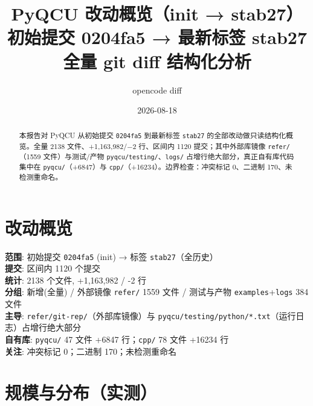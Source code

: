 \documentclass[UTF8]{ctexart}
\title{PyQCU 改动概览（init → stab27）\\[6pt]\large 初始提交 0204fa5 → 最新标签 stab27 全量 git diff 结构化分析}
\author{opencode diff}
\date{2026-08-18}
\begin{document}
\maketitle

\begin{abstract}
本报告对 PyQCU 从初始提交 \texttt{0204fa5} 到最新标签 \texttt{stab27} 的全部改动做只读结构化概览。全量 2138 文件、+1,163,982/−2 行、区间内 1120 提交；其中外部库镜像 \texttt{refer/}（1559 文件）与测试/产物 \texttt{pyqcu/testing/}、\texttt{logs/} 占增行绝大部分，真正自有库代码集中在 \texttt{pyqcu/}（+6847）与 \texttt{cpp/}（+16234）。边界检查：冲突标记 0、二进制 170、未检测重命名。
\end{abstract}

\tableofcontents

\section{改动概览}

\begin{keybox}
\textbf{范围}: 初始提交 \texttt{0204fa5} (init) → 标签 \texttt{stab27}（全历史）\\
\textbf{提交}: 区间内 1120 个提交\\
\textbf{统计}: 2138 个文件, +1,163,982 / -2 行\\
\textbf{分组}: 新增(全量) / 外部镜像 \texttt{refer/} 1559 文件 / 测试与产物 \texttt{examples}+\texttt{logs} 384 文件\\
\textbf{主导}: \texttt{refer/git-rep/}（外部库镜像）与 \texttt{pyqcu/testing/python/*.txt}（运行日志）占增行绝大部分\\
\textbf{自有库}: \texttt{pyqcu/} 47 文件 +6847 行；\texttt{cpp/} 78 文件 +16234 行\\
\textbf{关注}: 冲突标记 0；二进制 170；未检测重命名
\end{keybox}

\section{规模与分布（实测）}
\end{document}
